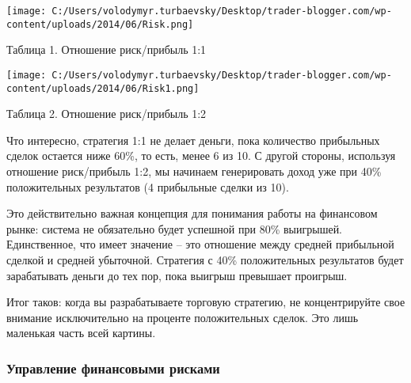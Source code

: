 \documentclass[a5paper]{article}
\begin{document}
\texttt{[image: C:/Users/volodymyr.turbaevsky/Desktop/trader-blogger.com/wp-content/uploads/2014/06/Risk.png]}

Таблица 1. Отношение риск/прибыль 1:1

\texttt{[image: C:/Users/volodymyr.turbaevsky/Desktop/trader-blogger.com/wp-content/uploads/2014/06/Risk1.png]}

Таблица 2. Отношение риск/прибыль 1:2

Что интересно, стратегия 1:1 не делает деньги, пока количество прибыльных сделок остается ниже 60\%, то есть, менее 6 из 10. С другой стороны, используя отношение риск/прибыль 1:2, мы начинаем генерировать доход уже при 40\% положительных результатов (4 прибыльные сделки из 10).

Это действительно важная концепция для понимания работы на финансовом рынке: система не обязательно будет успешной при 80\% выигрышей. Единственное, что имеет значение – это отношение между средней прибыльной сделкой и средней убыточной. Стратегия с 40\% положительных результатов будет зарабатывать деньги до тех пор, пока выигрыш превышает проигрыш.

Итог таков: когда вы разрабатываете торговую стратегию, не концентрируйте свое внимание исключительно на проценте положительных сделок. Это лишь маленькая часть всей картины.

\subsubsection{Управление финансовыми рисками}
\end{document}
